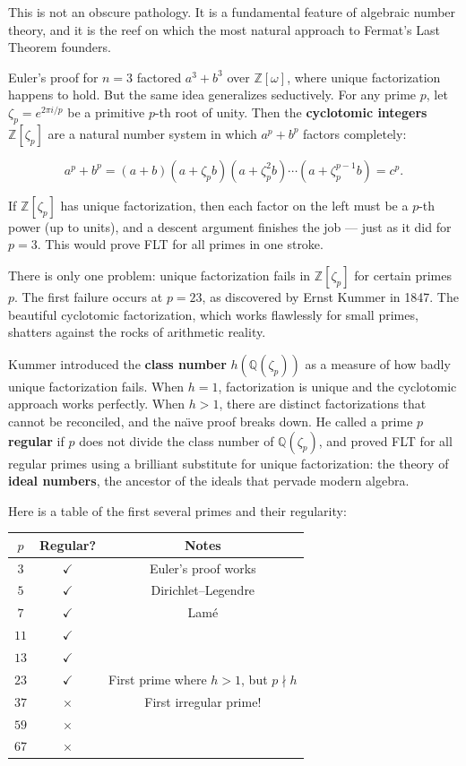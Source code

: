 This is not an obscure pathology. It is a fundamental feature of algebraic number theory, and it is the reef on which the most natural approach to Fermat's Last Theorem founders.

Euler's proof for $n = 3$ factored $a^3 + b^3$ over $\mathbb{Z}[\omega]$, where unique factorization happens to hold. But the same idea generalizes seductively. For any prime $p$, let $\zeta_p = e^{2\pi i/p}$ be a primitive $p$-th root of unity. Then the \textbf{cyclotomic integers} $\mathbb{Z}[\zeta_p]$ are a natural number system in which $a^p + b^p$ factors completely:

\[
a^p + b^p = (a + b)(a + \zeta_p b)(a + \zeta_p^2 b) \cdots (a + \zeta_p^{p-1} b) = c^p.
\]

If $\mathbb{Z}[\zeta_p]$ has unique factorization, then each factor on the left must be a $p$-th power (up to units), and a descent argument finishes the job --- just as it did for $p = 3$. This would prove FLT for all primes in one stroke.

There is only one problem: unique factorization fails in $\mathbb{Z}[\zeta_p]$ for certain primes $p$. The first failure occurs at $p = 23$, as discovered by Ernst Kummer in 1847. The beautiful cyclotomic factorization, which works flawlessly for small primes, shatters against the rocks of arithmetic reality.

Kummer introduced the \textbf{class number} $h(\mathbb{Q}(\zeta_p))$ as a measure of how badly unique factorization fails. When $h = 1$, factorization is unique and the cyclotomic approach works perfectly. When $h > 1$, there are distinct factorizations that cannot be reconciled, and the na\"{\i}ve proof breaks down. He called a prime $p$ \textbf{regular} if $p$ does not divide the class number of $\mathbb{Q}(\zeta_p)$, and proved FLT for all regular primes using a brilliant substitute for unique factorization: the theory of \textbf{ideal numbers}, the ancestor of the ideals that pervade modern algebra.

Here is a table of the first several primes and their regularity:

\begin{center}
\begin{tabular}{c c c}
\toprule
$p$ & Regular? & Notes \\
\midrule
$3$ & \ensuremath{\checkmark} & Euler's proof works \\
$5$ & \ensuremath{\checkmark} & Dirichlet--Legendre \\
$7$ & \ensuremath{\checkmark} & Lam\'e \\
$11$ & \ensuremath{\checkmark} &  \\
$13$ & \ensuremath{\checkmark} &  \\
$23$ & \ensuremath{\checkmark} & First prime where $h > 1$, but $p \nmid h$ \\
$37$ & \ensuremath{\times} & First irregular prime! \\
$59$ & \ensuremath{\times} &  \\
$67$ & \ensuremath{\times} &  \\
\bottomrule
\end{tabular}
\end{center}

